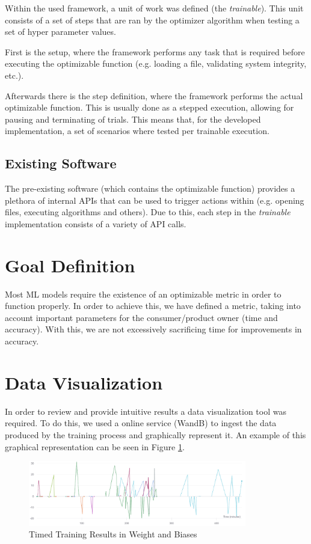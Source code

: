 \documentclass[runningheads]{llncs}
\begin{document}
Within the used framework, a unit of work was defined (the \textit{trainable}). This unit consists of a set of steps that are ran by the optimizer algorithm when testing a set of hyper parameter values.

First is the setup, where the framework performs any task that is required before executing the optimizable function (e.g. loading a file, validating system integrity, etc.).

Afterwards there is the step definition, where the framework performs the actual optimizable function. This is usually done as a stepped execution, allowing for pausing and terminating of trials. This means that, for the developed implementation, a set of scenarios where tested per trainable execution.

\subsection{Existing Software}

The pre-existing software (which contains the optimizable function) provides a plethora of internal APIs that can be used to trigger actions within (e.g. opening files, executing algorithms and others). Due to this, each step in the \textit{trainable} implementation consists of a variety of API calls.

\section{Goal Definition}

Most ML models require the existence of an optimizable metric in order to function properly. In order to achieve this, we have defined a metric, taking into account important parameters for the consumer/product owner (time and accuracy). With this, we are not excessively sacrificing time for improvements in accuracy.

\section{Data Visualization}

In order to review and provide intuitive results a data visualization tool was required. To do this, we used a online service (WandB) to ingest the data produced by the training process and graphically represent it. An example of this graphical representation can be seen in Figure \ref{fig:wandb}.

\begin{figure}
	\centering
	\includegraphics[width=0.85\textwidth]{images/timed_timeline.png}
	\caption{Timed Training Results in Weight and Biases}
	\label{fig:wandb}
\end{figure}
\end{document}

